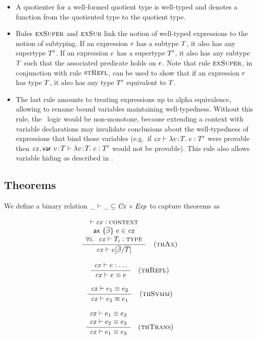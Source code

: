 \begin{itemize}
\item
A quotienter for a well-formed quotient type is well-typed and denotes a
function from the quotiented type to the quotient type.
\item
Rules $\textsc{exSuper}$ and $\textsc{exSub}$ link the notion of well-typed expressions to the
notion of subtyping. If an expression $e$ has a subtype $T$, it also
has any supertype $T'$. If an expression $e$ has a supertype $T'$,
it also has any subtype $T$ such that the associated predicate holds on
$e$. Note that rule $\textsc{exSuper}$, in conjunction with rule $\textsc{stRefl}$, can
be used to show that if an expression $e$ has type $T$, it also has any
type $T'$ equivalent to $T$.
\item
The last rule amounts to treating expressions up to alpha equivalence,
allowing to rename bound variables maintaining well-typedness. Without this
rule, the \MS\ logic would be non-monotone, because extending a context with
variable declarations may invalidate conclusions about the well-typedness of
expressions that bind those variables (e.g.\ if $\mathit{cx}\vdash\lambda v\!:\!T.\;e:T'$ were
provable then $\mathit{cx},\mathsf{var}\ v\!:\!T\vdash\lambda v\!:\!T.\;e:T'$ would not be
provable). This rule also allows variable hiding as described in \cite{lm}.
\end{itemize}

\subsection{Theorems}

We define a binary relation $\_\vdash\_\subseteq\mathit{Cx}\times\mathit{Exp}$ to capture theorems
as

\[
\frac{\begin{array}{c}\vdash\mathit{cx}:\textsc{context}\\\mathsf{ax}\ \{\overline{\beta}\}\ e\in\mathit{cx}\\\forall i.\ \ \mathit{cx}\vdash T_i:\textsc{type}\end{array}}{\mathit{cx}\vdash e[\overline{\beta}/\overline{T}]}\quad\mbox{(\textsc{thAx})}
\]


\[
\frac{\begin{array}{c}\mathit{cx}\vdash e:\ldots\end{array}}{\mathit{cx}\vdash e\equiv e}\quad\mbox{(\textsc{thRefl})}
\]

\[
\frac{\begin{array}{c}\mathit{cx}\vdash e_1\equiv e_2\end{array}}{\mathit{cx}\vdash e_2\equiv e_1}\quad\mbox{(\textsc{thSymm})}
\]

\[
\frac{\begin{array}{c}\mathit{cx}\vdash e_1\equiv e_2\\\mathit{cx}\vdash e_2\equiv e_3\end{array}}{\mathit{cx}\vdash e_1\equiv e_3}\quad\mbox{(\textsc{thTrans})}
\]

